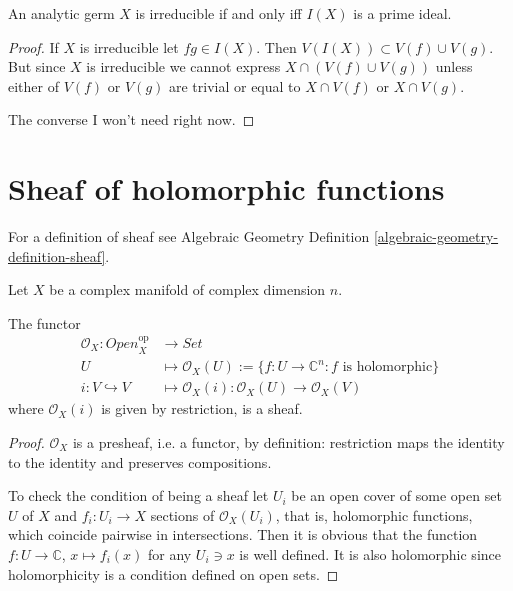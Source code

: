 \begin{lemma}
\label{lemma-analytic-germ-is-irreducible-iff-prime-ideal}
\cite[Lemma 1.1.28]{huc}
An analytic germ $X$ is irreducible if and only iff $I(X)$ is a prime ideal.
\end{lemma}

\begin{proof}
If $X$ is irreducible let $fg\in I(X)$. Then $V(I(X))\subset V(f)\cup V(g)$. But
since $X$ is irreducible we cannot express $X \cap (V(f) \cup  V(g))$ unless
either of $V(f)$ or $V(g)$ are trivial or equal to $X \cap V(f)$ or $X \cap
V(g)$.

The converse I won't need right now.
\end{proof}

\section{Sheaf of holomorphic functions}
\label{section-sheaf-of-holomorphic-functions}

For a definition of sheaf
see Algebraic Geometry Definition 
\ref{algebraic-geometry-definition-sheaf}.

\begin{lemma}
\label{lemma-O_X-is-a-sheaf}
Let $X$ be a complex manifold of complex dimension $n$.

The functor
\begin{align*}
\mathcal{O}_X: \mathit{Open}_X^{\text{op}} &\longrightarrow \mathit{Set}
\\
U &\longmapsto \mathcal{O}_X(U):=\{f:U\to \mathbb{C}^n:
f \text{ is holomorphic}\}\\
i:V \hookrightarrow V &\longmapsto 
\mathcal{O}_X(i):\mathcal{O}_X(U) \to \mathcal{O}_X(V)
\end{align*}
where $\mathcal{O}_X(i)$ is given by restriction,
is a sheaf.
\end{lemma}

\begin{proof}
$\mathcal{O}_X$ is a presheaf,
i.e. a functor,
by definition: restriction
maps the identity to the identity
and preserves compositions.

To check the condition of being a sheaf let
$U_i$ be an open cover of some open set $U$ of $X$
and $f_i:U_i \to X$ sections of $\mathcal{O}_X(U_i)$,
that is, holomorphic functions, which
coincide pairwise in intersections.
Then it is obvious that the function $f:U \to \mathbb{C}$,
$x \mapsto f_i(x)$ for any $U_i \ni x$ 
is well defined. It is also holomorphic
since holomorphicity is a condition defined on
open sets.
\end{proof}

